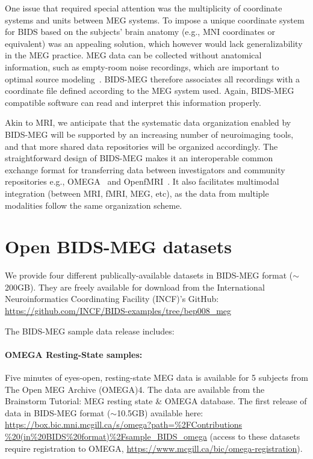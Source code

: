 One issue that required special attention was the multiplicity of coordinate systems and units between MEG systems. To impose a unique coordinate system for BIDS based on the subjects’ brain anatomy (e.g., MNI coordinates or equivalent) was an appealing solution, which however would lack generalizability in the MEG practice. MEG data can be collected without anatomical information, such as empty-room noise recordings, which are important to optimal source modeling~\citep{gross-etal:13}. BIDS-MEG therefore associates all recordings with a coordinate file defined according to the MEG system used. Again, BIDS-MEG compatible software can read and interpret this information properly.

Akin to MRI, we anticipate that the systematic data organization enabled by BIDS-MEG will be supported by an increasing number of neuroimaging tools, and that more shared data repositories will be organized accordingly. The straightforward design of BIDS-MEG makes it an interoperable common exchange format for transferring data between investigators and community repositories e.g., OMEGA~\citep{niso2016omega} and OpenfMRI~\citep{poldrack2017openfmri}. It also facilitates multimodal integration (between MRI, fMRI, MEG, etc), as the data from multiple modalities follow the same organization scheme.

\section{Open BIDS-MEG datasets}
We provide four different publically-available datasets in BIDS-MEG format ($\sim$200GB). They are freely available for download from the International Neuroinformatics Coordinating Facility (INCF)’s  GitHub: \url{https://github.com/INCF/BIDS-examples/tree/bep008_meg}

The BIDS-MEG sample data release includes: 

\paragraph{OMEGA Resting-State samples:} Five minutes of eyes-open, resting-state MEG data is available for 5 subjects from The Open MEG Archive (OMEGA)4. The data are available from the Brainstorm Tutorial: MEG resting state \& OMEGA database. The first release of data in BIDS-MEG format ($\sim$10.5GB) available here: 
\url{https://box.bic.mni.mcgill.ca/s/omega?path=\%2FContributions
\%20(in\%20BIDS\%20format)\%2Fsample_BIDS_omega} (access to these datasets require registration to OMEGA, \url{https://www.mcgill.ca/bic/omega-registration}).


